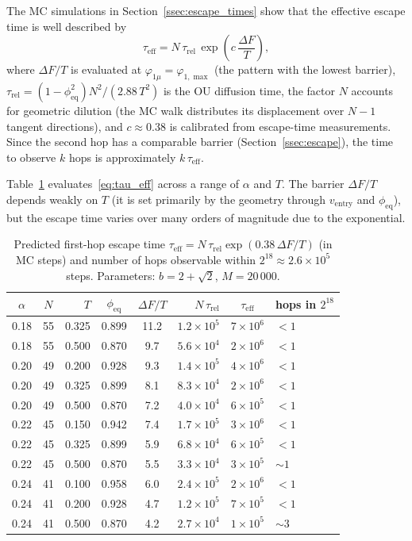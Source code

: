 \documentclass[11pt]{article}
\begin{document}
The MC simulations in Section~\ref{ssec:escape_times} show that the effective escape time is well described by
\begin{equation}
\tau_{\mathrm{eff}} = N\,\tau_{\mathrm{rel}}\,\exp\!\left(c\,\frac{\Delta F}{T}\right),
\label{eq:tau_eff}
\end{equation}
where $\Delta F/T$ is evaluated at $\varphi_{1\mu} = \varphi_{1,\max}$ (the pattern with the lowest barrier), $\tau_{\mathrm{rel}} = (1-\phi_{\mathrm{eq}}^2)N^2/(2.88\,T^2)$ is the OU diffusion time, the factor $N$ accounts for geometric dilution (the MC walk distributes its displacement over $N-1$ tangent directions), and $c \approx 0.38$ is calibrated from escape-time measurements.  Since the second hop has a comparable barrier (Section~\ref{ssec:escape}), the time to observe $k$ hops is approximately $k\,\tau_{\mathrm{eff}}$.

Table~\ref{tab:escape_times} evaluates~\eqref{eq:tau_eff} across a range of $\alpha$ and $T$.  The barrier $\Delta F/T$ depends weakly on $T$ (it is set primarily by the geometry through $v_{\mathrm{entry}}$ and $\phi_{\mathrm{eq}}$), but the escape time varies over many orders of magnitude due to the exponential.

\begin{table}[h]
\centering
\caption{Predicted first-hop escape time $\tau_{\mathrm{eff}} = N\,\tau_{\mathrm{rel}}\exp(0.38\,\Delta F/T)$ (in MC steps) and number of hops observable within $2^{18} \approx 2.6 \times 10^5$ steps.  Parameters: $b = 2+\sqrt{2}$, $M = 20\,000$.}
\label{tab:escape_times}
\begin{tabular}{ccrccrcl}
\toprule
$\alpha$ & $N$ & $T$ & $\phi_{\mathrm{eq}}$ & $\Delta F/T$ & $N\,\tau_{\mathrm{rel}}$ & $\tau_{\mathrm{eff}}$ & hops in $2^{18}$ \\
\midrule
0.18 & 55 & 0.325 & 0.899 & 11.2 & $1.2 \times 10^5$ & $7 \times 10^6$ & $< 1$ \\
0.18 & 55 & 0.500 & 0.870 & 9.7 & $5.6 \times 10^4$ & $2 \times 10^6$ & $< 1$ \\
\midrule
0.20 & 49 & 0.200 & 0.928 & 9.3 & $1.4 \times 10^5$ & $4 \times 10^6$ & $< 1$ \\
0.20 & 49 & 0.325 & 0.899 & 8.1 & $8.3 \times 10^4$ & $2 \times 10^6$ & $< 1$ \\
0.20 & 49 & 0.500 & 0.870 & 7.2 & $4.0 \times 10^4$ & $6 \times 10^5$ & $< 1$ \\
\midrule
0.22 & 45 & 0.150 & 0.942 & 7.4 & $1.7 \times 10^5$ & $3 \times 10^6$ & $< 1$ \\
0.22 & 45 & 0.325 & 0.899 & 5.9 & $6.8 \times 10^4$ & $6 \times 10^5$ & $< 1$ \\
0.22 & 45 & 0.500 & 0.870 & 5.5 & $3.3 \times 10^4$ & $3 \times 10^5$ & $\sim 1$ \\
\midrule
0.24 & 41 & 0.100 & 0.958 & 6.0 & $2.4 \times 10^5$ & $2 \times 10^6$ & $< 1$ \\
0.24 & 41 & 0.200 & 0.928 & 4.7 & $1.2 \times 10^5$ & $7 \times 10^5$ & $< 1$ \\
0.24 & 41 & 0.500 & 0.870 & 4.2 & $2.7 \times 10^4$ & $1 \times 10^5$ & $\sim 3$ \\
\bottomrule
\end{tabular}
\end{table}
\end{document}
